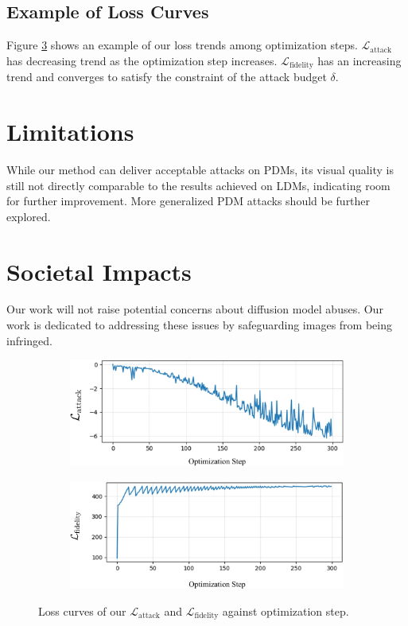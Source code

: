 \subsection{Example of Loss Curves}

Figure \ref{supp:loss_curve} shows an example of our loss trends among optimization steps. $\mathcal{L}_\text{attack}$ has decreasing trend as the optimization step increases. $\mathcal{L}_\text{fidelity}$ has an increasing trend and converges to satisfy the constraint of the attack budget $\delta$.

\section{Limitations}
While our method can deliver acceptable attacks on PDMs, its visual quality is still not directly comparable to the results achieved on LDMs, indicating room for further improvement. More generalized PDM attacks should be further explored. 

\section{Societal Impacts}
Our work will not raise potential concerns about diffusion model abuses. Our work is dedicated to addressing these issues by safeguarding images from being infringed.

\begin{figure}
\centering
\begin{subfigure}{1\linewidth}
    \centering
    \includegraphics[width=0.7\linewidth]{figures/attack_loss_curve.pdf}
    \label{fig:attack_loss_curve}
\end{subfigure}

\begin{subfigure}{1\linewidth}
    \centering
    \includegraphics[width=0.7\linewidth]{figures/fidelity_loss_curve.pdf}
    \label{fig:fidelity_loss_curve}
\end{subfigure}
\caption{Loss curves of our $\mathcal{L}_\text{attack}$ and $\mathcal{L}_\text{fidelity}$ against optimization step.}
\label{supp:loss_curve}
\end{figure}

